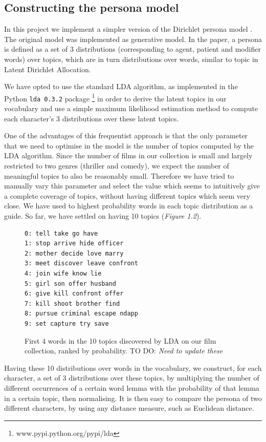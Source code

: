 \documentclass[bsc,frontabs,singlespacing,parskip]{infthesis} %
\begin{document}
\subsection{Constructing the persona model}
In this project we implement a simpler version of the Dirichlet persona model \cite{Blei2003}. The original model was implemented as generative model. In the paper, a persona is defined as a set of 3 distributions (corresponding to agent, patient and modifier words) over topics, which are in turn distributions over words, similar to topic in Latent Dirichlet Allocation.

We have opted to use the standard LDA algorithm, as implemented in the Python \texttt{lda 0.3.2} package \footnote{ www.pypi.python.org/pypi/lda} in order to derive the latent topics in our vocabulary and use a simple maximum likelihood estimation method to compute each character's 3 distributions over these latent topics.

One of the advantages of this frequentist approach is that the only parameter that we need to optimise in the model is the number of topics computed by the LDA algorithm. Since the number of films in our collection is small and largely restricted to two genres (thriller and comedy), we expect the number of meaningful topics to also be reasonably small. Therefore we have tried to manually vary this parameter and select the value which seems to intuitively give a complete coverage of topics, without having different topics which seem very close. We have used to highest probability words in each topic distribution as a guide. So far, we have settled on having 10 topics (\textit{Figure 1.2}).

\begin{figure}[h]
\centering
\begin{minipage}{8cm}
\begin{Verbatim}[frame=single]
0: tell take go have 
1: stop arrive hide officer 
2: mother decide love marry 
3: meet discover leave confront 
4: join wife know lie 
5: girl son offer husband 
6: give kill confront offer
7: kill shoot brother find 
8: pursue criminal escape ndapp
9: set capture try save 
\end{Verbatim}
\end{minipage}
\caption{First 4 words in the 10 topics discovered by LDA on our film collection, ranked by probability. TO DO: \textit{Need to update these}}
\label{topics}
\end{figure}

Having these 10 distributions over words in the vocabulary, we construct, for each character, a set of 3 distributions over these topics, by multiplying the number of different occurrences of a certain word lemma with the probability of that lemma in a certain topic, then normalising. It is then easy to compare the persona of two different characters, by using any distance measure, such as Euclidean distance.
\end{document}
